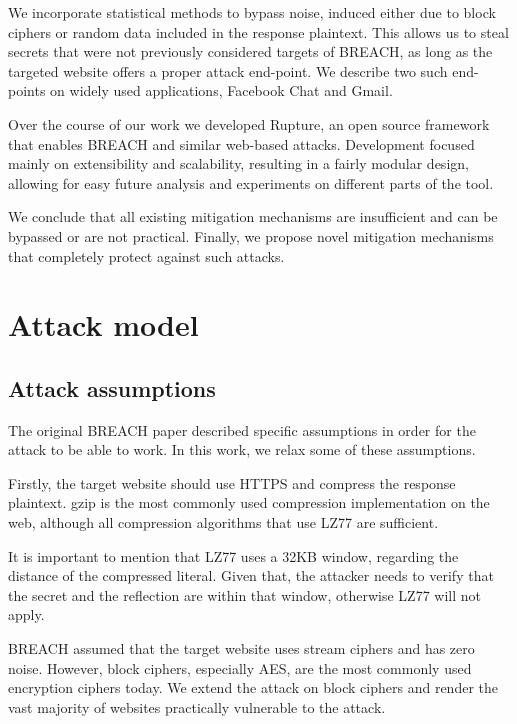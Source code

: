\documentclass[a4paper, 11 pt, conference]{article}  %
\begin{document}
We incorporate statistical methods to bypass noise, induced either due to block ciphers or
random data included in the response plaintext. This allows us
to steal secrets that were not previously considered targets of BREACH, as long as the
targeted website offers a proper attack end-point. We describe two such end-points on
widely used applications, Facebook Chat and Gmail.

Over the course of our work we developed Rupture, an open source framework that enables BREACH
and similar web-based attacks. Development focused mainly on extensibility and scalability, resulting in a
fairly modular design, allowing for easy future analysis and experiments on different parts of the tool.

We conclude that all existing mitigation mechanisms are insufficient and can be
bypassed or are not practical. Finally, we propose novel mitigation mechanisms
that completely protect against such attacks.


\section{Attack model}

\subsection{Attack assumptions}

The original BREACH paper described specific assumptions in order for the attack to be able
to work. In this work, we relax some of these assumptions.

Firstly, the target website should use HTTPS and compress the response plaintext.
gzip is the most commonly used compression implementation on the web,
although all
compression algorithms that use LZ77 \cite{c7} are sufficient.

It is important to mention that LZ77 uses a 32KB window, regarding the distance of the compressed literal.
Given that, the attacker needs to verify that the secret and the reflection are within that window, otherwise LZ77 will
not apply.

BREACH assumed that the target website uses stream ciphers and has zero noise.
However, block ciphers, especially AES, are the most commonly used encryption
ciphers today. We extend the attack on block ciphers and render the
vast majority of websites practically vulnerable to the attack.
\end{document}
